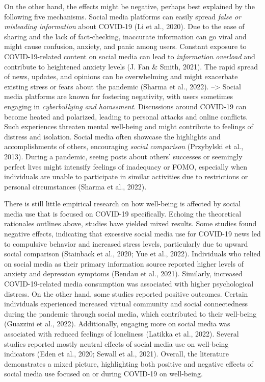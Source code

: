 \documentclass[
  man,mask,floatsintext]{apa7}
\begin{document}
On the other hand, the effects might be negative, perhaps best explained by the following five mechanisms.
Social media platforms can easily spread \emph{false or misleading information} about COVID-19 (Li et al., 2020).
Due to the ease of sharing and the lack of fact-checking, inaccurate information can go viral and might cause confusion, anxiety, and panic among users.
Constant exposure to COVID-19-related content on social media can lead to \emph{information overload} and contribute to heightened anxiety levels (J. Fan \& Smith, 2021).
The rapid spread of news, updates, and opinions can be overwhelming and might exacerbate existing stress or fears about the pandemic (Sharma et al., 2022).
--\textgreater{}
Social media platforms are known for fostering negativity, with users sometimes engaging in \emph{cyberbullying and harassment}.
Discussions around COVID-19 can become heated and polarized, leading to personal attacks and online conflicts.
Such experiences threaten mental well-being and might contribute to feelings of distress and isolation.
Social media often showcase the highlights and accomplishments of others, encouraging \emph{social comparison} (Przybylski et al., 2013).
During a pandemic, seeing posts about others' successes or seemingly perfect lives might intensify feelings of inadequacy or FOMO, especially when individuals are unable to participate in similar activities due to restrictions or personal circumstances (Sharma et al., 2022).

There is still little empirical research on how well-being is affected by social media use that is focused on COVID-19 specifically.
Echoing the theoretical rationales outlines above, studies have yielded mixed results.
Some studies found negative effects, indicating that excessive social media use for COVID-19 news led to compulsive behavior and increased stress levels, particularly due to upward social comparison (Stainback et al., 2020; Yue et al., 2022).
Individuals who relied on social media as their primary information source reported higher levels of anxiety and depression symptoms (Bendau et al., 2021).
Similarly, increased COVID-19-related media consumption was associated with higher psychological distress.
On the other hand, some studies reported positive outcomes.
Certain individuals experienced increased virtual community and social connectedness during the pandemic through social media, which contributed to their well-being (Guazzini et al., 2022).
Additionally, engaging more on social media was associated with reduced feelings of loneliness (Latikka et al., 2022).
Several studies reported mostly neutral effects of social media use on well-being indicators (Eden et al., 2020; Sewall et al., 2021).
Overall, the literature demonstrates a mixed picture, highlighting both positive and negative effects of social media use focused on or during COVID-19 on well-being.
\end{document}
